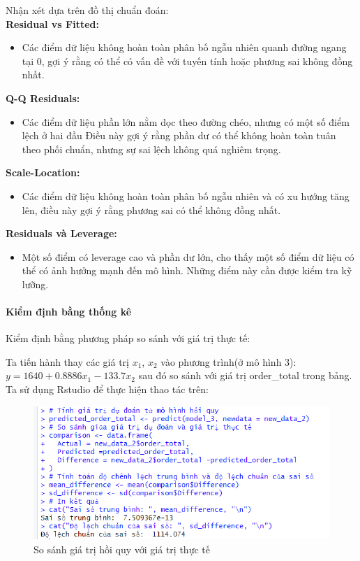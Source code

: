 Nhận xét dựa trên đồ thị chuẩn đoán:\\
\textbf{Residual vs Fitted:}
\begin{itemize}
 \item Các điểm dữ liệu không hoàn toàn phân bố ngẫu nhiên quanh đường ngang tại 0, gợi ý rằng có thể có vấn đề với tuyến tính hoặc phương sai không đồng nhất. 
\end{itemize}
 \textbf{Q-Q Residuals:}
 \begin{itemize}
\item Các điểm dữ liệu phần lớn nằm dọc theo đường chéo, nhưng có một số điểm lệch ở hai đầu Điều này gợi ý rằng phần dư có thể không hoàn toàn tuân theo phối chuẩn, nhưng sự sai lệch không quá nghiêm trọng.
 \end{itemize}
\textbf{Scale-Location:}
\begin{itemize}
\item Các điểm dữ liệu không hoàn toàn phân bố ngẫu nhiên và có xu hướng tăng lên, điều này gợi ý rằng phương sai có thể không đồng nhất.
\end{itemize}
\textbf{Residuals và Leverage:}
\begin{itemize}
\item Một số điểm có leverage cao và phần dư lớn, cho thấy một số điểm dữ liệu  có thể có ảnh hưởng mạnh đến mô hình. Những điểm này cần được kiểm tra kỹ lưỡng.
\end{itemize}
\paragraph{Kiểm định bằng thống kê}

Kiểm định bằng phương pháp so sánh với giá trị thực tế:

Ta tiến hành thay các giá trị $x_1$, $x_2$ vào phương trình(ở mô hình 3): $y= 1640 + 0.8886x_1 - 133.7 x_2$ sau đó so sánh với giá trị order\_total trong bảng. Ta sử dụng Rstudio để thực hiện thao tác trên:

\begin{figure}[!htp]
  \centering
  \includegraphics[width=0.5\linewidth]{graphics/5.5.7.png}
  \caption{So sánh giá trị hồi quy với giá trị thực tế }
\end{figure}

